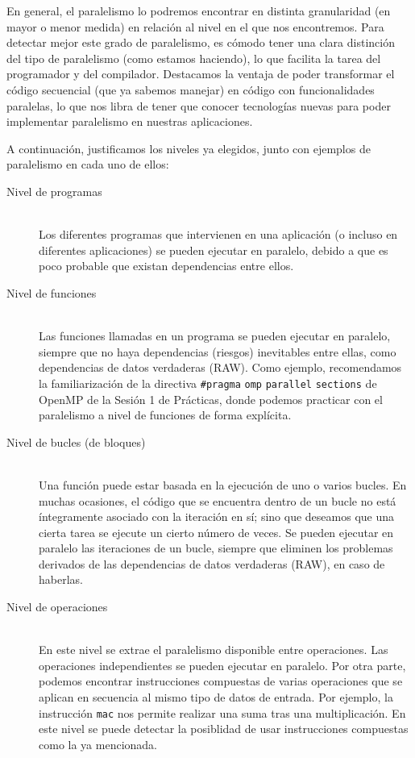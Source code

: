En general, el paralelismo lo podremos encontrar en distinta granularidad (en mayor o menor medida) en relación al nivel en el que nos encontremos. Para detectar mejor este grado de paralelismo, es cómodo tener una clara distinción del tipo de paralelismo (como estamos haciendo), lo que facilita la tarea del programador y del compilador. Destacamos la ventaja de poder transformar el código secuencial (que ya sabemos manejar) en código con funcionalidades paralelas, lo que nos libra de tener que conocer tecnologías nuevas para poder implementar paralelismo en nuestras aplicaciones.

A continuación, justificamos los niveles ya elegidos, junto con ejemplos de paralelismo en cada uno de ellos:
\begin{description}
    \item [Nivel de programas]~\\
        Los diferentes programas que intervienen en una aplicación (o incluso en diferentes aplicaciones) se pueden ejecutar en paralelo, debido a que es poco probable que existan dependencias entre ellos.
    \item [Nivel de funciones]~\\
    Las funciones llamadas en un programa se pueden ejecutar en paralelo, siempre que no haya dependencias (riesgos) inevitables entre ellas, como dependencias de datos verdaderas (RAW). Como ejemplo, recomendamos la familiarización de la directiva \verb|#pragma| \verb|omp| \verb|parallel| \verb|sections| de OpenMP de la Sesión 1 de Prácticas, donde podemos practicar con el paralelismo a nivel de funciones de forma explícita.
    \item [Nivel de bucles (de bloques)]~\\
        Una función puede estar basada en la ejecución de uno o varios bucles. En muchas ocasiones, el código que se encuentra dentro de un bucle no está íntegramente asociado con la iteración en sí; sino que deseamos que una cierta tarea se ejecute un cierto número de veces. Se pueden ejecutar en paralelo las iteraciones de un bucle, siempre que eliminen los problemas derivados de las dependencias de datos verdaderas (RAW), en caso de haberlas.
    \item [Nivel de operaciones]~\\
        En este nivel se extrae el paralelismo disponible entre operaciones. Las operaciones independientes se pueden ejecutar en paralelo. Por otra parte, podemos encontrar instrucciones compuestas de varias operaciones que se aplican en secuencia al mismo tipo de datos de entrada. Por ejemplo, la instrucción \verb|mac| nos permite realizar una suma tras una multiplicación. En este nivel se puede detectar la posiblidad de usar instrucciones compuestas como la ya mencionada.
\end{description}

